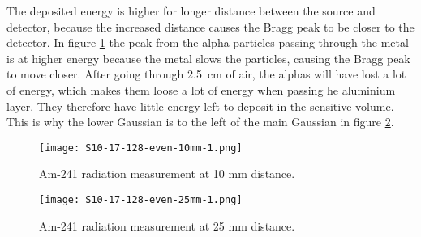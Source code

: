 \documentclass[../main/thesis.tex]{subfiles}
\begin{document}
The deposited energy is higher for longer distance between the source and detector, because the increased distance causes the Bragg peak to be closer to the detector. In figure \ref{fig-3dmimic-am-17-128-10} the peak from the alpha particles passing through the metal is at higher energy because the metal slows the particles, causing the Bragg peak to move closer. After going through 2.5~cm of air, the alphas will have lost a lot of energy, which makes them loose a lot of energy when passing he aluminium layer. They therefore have little energy left to deposit in the sensitive volume. This is why the lower Gaussian is to the left of the main Gaussian in figure \ref{fig-3dmimic-am-17-128-25}. 

\begin{figure}[p]
	\centering
	\texttt{[image: S10-17-128-even-10mm-1.png]}
	\caption{Am-241 radiation measurement at 10 mm distance.}
	\label{fig-3dmimic-am-17-128-10}
\end{figure}

\begin{figure}[p]
	\centering
	\texttt{[image: S10-17-128-even-25mm-1.png]}
	\caption{Am-241 radiation measurement at 25 mm distance.}
	\label{fig-3dmimic-am-17-128-25}
\end{figure}
\end{document}
